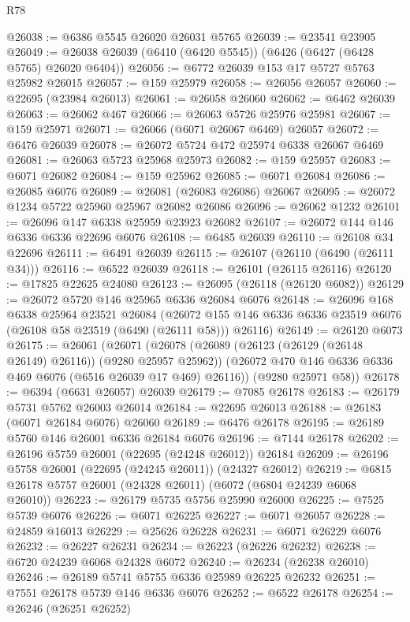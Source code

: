 \begin{lexlean}{R78}
\begin{coremodule}
@26038 := @6386 @5545 @26020 @26031 @5765
@26039 := @23541 @23905
@26049 := @26038 @26039 (@6410 (@6420 @5545)) (@6426 (@6427 (@6428 @5765) @26020 @6404))
@26056 := @6772 @26039 @153 @17 @5727 @5763 @25982 @26015
@26057 := @159 @25979
@26058 := @26056 @26057
@26060 := @22695 (@23984 @26013)
@26061 := @26058 @26060
@26062 := @6462 @26039
@26063 := @26062 @467
@26066 := @26063 @5726 @25976 @25981
@26067 := @159 @25971
@26071 := @26066 (@6071 @26067 @6469) @26057
@26072 := @6476 @26039
@26078 := @26072 @5724 @472 @25974 @6338 @26067 @6469
@26081 := @26063 @5723 @25968 @25973
@26082 := @159 @25957
@26083 := @6071 @26082
@26084 := @159 @25962
@26085 := @6071 @26084
@26086 := @26085 @6076
@26089 := @26081 (@26083 @26086) @26067
@26095 := @26072 @1234 @5722 @25960 @25967 @26082 @26086
@26096 := @26062 @1232
@26101 := @26096 @147 @6338 @25959 @23923 @26082
@26107 := @26072 @144 @146 @6336 @6336 @22696 @6076
@26108 := @6485 @26039
@26110 := @26108 @34 @22696
@26111 := @6491 @26039
@26115 := @26107 (@26110 (@6490 (@26111 @34)))
@26116 := @6522 @26039
@26118 := @26101 (@26115 @26116)
@26120 := @17825 @22625 @24080
@26123 := @26095 (@26118 (@26120 @6082))
@26129 := @26072 @5720 @146 @25965 @6336 @26084 @6076
@26148 := @26096
    @168
    @6338
    @25964
    @23521
    @26084
    (@26072 @155 @146 @6336 @6336 @23519 @6076 (@26108 @58 @23519 (@6490 (@26111 @58))) @26116)
@26149 := @26120 @6073
@26175 := @26061
    (@26071
      (@26078
        (@26089 (@26123 (@26129 (@26148 @26149) @26116)) (@9280 @25957 @25962))
        (@26072 @470 @146 @6336 @6336 @469 @6076 (@6516 @26039 @17 @469) @26116))
      (@9280 @25971 @58))
@26178 := @6394 (@6631 @26057) @26039
@26179 := @7085 @26178
@26183 := @26179 @5731 @5762 @26003 @26014
@26184 := @22695 @26013
@26188 := @26183 (@6071 @26184 @6076) @26060
@26189 := @6476 @26178
@26195 := @26189 @5760 @146 @26001 @6336 @26184 @6076
@26196 := @7144 @26178
@26202 := @26196 @5759 @26001 (@22695 (@24248 @26012)) @26184
@26209 := @26196 @5758 @26001 (@22695 (@24245 @26011)) (@24327 @26012)
@26219 := @6815 @26178 @5757 @26001 (@24328 @26011) (@6072 (@6804 @24239 @6068 @26010))
@26223 := @26179 @5735 @5756 @25990 @26000
@26225 := @7525 @5739 @6076
@26226 := @6071 @26225
@26227 := @6071 @26057
@26228 := @24859 @16013
@26229 := @25626 @26228
@26231 := @6071 @26229 @6076
@26232 := @26227 @26231
@26234 := @26223 (@26226 @26232)
@26238 := @6720 @24239 @6068 @24328 @6072
@26240 := @26234 (@26238 @26010)
@26246 := @26189 @5741 @5755 @6336 @25989 @26225 @26232
@26251 := @7551 @26178 @5739 @146 @6336 @6076
@26252 := @6522 @26178
@26254 := @26246 (@26251 @26252)

\end{coremodule}
\end{lexlean}
